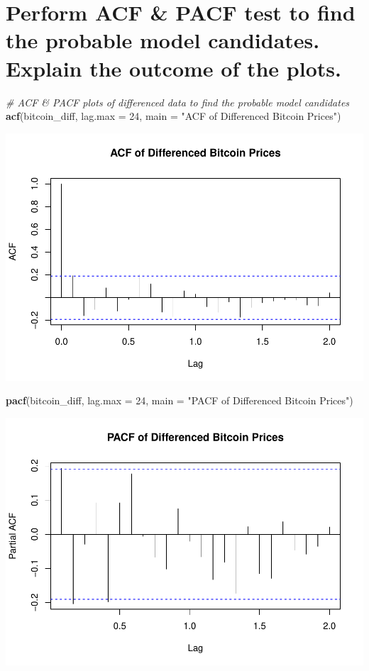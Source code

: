 \documentclass[
]{book}
\newenvironment{Shaded}{\begin{snugshade}}{\end{snugshade}}
\newcommand{\AttributeTok}[1]{\textcolor[rgb]{0.13,0.29,0.53}{#1}}
\newcommand{\CommentTok}[1]{\textcolor[rgb]{0.56,0.35,0.01}{\textit{#1}}}
\newcommand{\DecValTok}[1]{\textcolor[rgb]{0.00,0.00,0.81}{#1}}
\newcommand{\FunctionTok}[1]{\textcolor[rgb]{0.13,0.29,0.53}{\textbf{#1}}}
\newcommand{\NormalTok}[1]{#1}
\newcommand{\StringTok}[1]{\textcolor[rgb]{0.31,0.60,0.02}{#1}}
\begin{document}
\section{Perform ACF \& PACF test to find the probable model candidates. Explain the outcome of the plots.}\label{perform-acf-pacf-test-to-find-the-probable-model-candidates.-explain-the-outcome-of-the-plots.}

\begin{Shaded}
\begin{Highlighting}[]
\CommentTok{\# ACF \& PACF plots of differenced data to find the probable model candidates}
\FunctionTok{acf}\NormalTok{(bitcoin\_diff, }\AttributeTok{lag.max =} \DecValTok{24}\NormalTok{, }\AttributeTok{main =} \StringTok{"ACF of Differenced Bitcoin Prices"}\NormalTok{)}
\end{Highlighting}
\end{Shaded}

\includegraphics{bookdown-demo_files/figure-latex/unnamed-chunk-39-1.pdf}

\begin{Shaded}
\begin{Highlighting}[]
\FunctionTok{pacf}\NormalTok{(bitcoin\_diff, }\AttributeTok{lag.max =} \DecValTok{24}\NormalTok{, }\AttributeTok{main =} \StringTok{"PACF of Differenced Bitcoin Prices"}\NormalTok{)}
\end{Highlighting}
\end{Shaded}

\includegraphics{bookdown-demo_files/figure-latex/unnamed-chunk-39-2.pdf}
\end{document}
